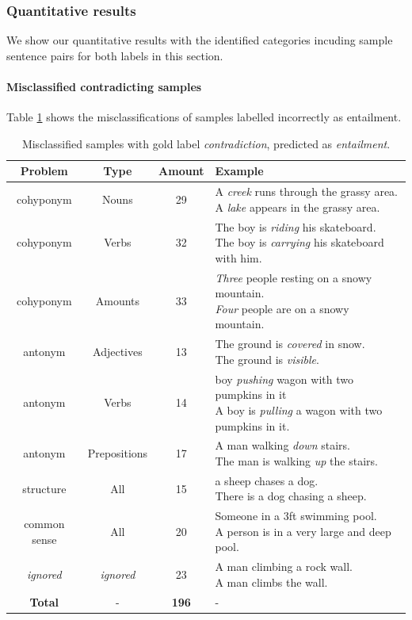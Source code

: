 \subsubsection{Quantitative results}
We show our quantitative results with the identified categories incuding sample sentence pairs for both labels in this section.

\paragraph*{Misclassified contradicting samples}
Table \ref{tab:misclassified_orig_contr} shows the misclassifications of samples labelled incorrectly as entailment.
\begin{table}[tph!]\label{tab:misclassified_orig_contr}
\centering
\begin{tabular}{cccl}
\textbf{Problem} & \textbf{Type} & \textbf{Amount} & \textbf{Example} \\
\toprule
cohyponym & Nouns & 29 & \specialcell{A \textit{creek} runs through the grassy area.\\A \textit{lake} appears in the grassy area.}\\
cohyponym & Verbs & 32 & \specialcell{The boy is \textit{riding} his skateboard.\\The boy is \textit{carrying} his skateboard with him.}\\
cohyponym & Amounts & 33 & \specialcell{\textit{Three} people resting on a snowy mountain.\\\textit{Four} people are on a snowy mountain.}\\
antonym & Adjectives & 13 & \specialcell{The ground is \textit{covered} in snow.\\The ground is \textit{visible}.}\\
antonym & Verbs & 14 & \specialcell{boy \textit{pushing} wagon with two pumpkins in it\\A boy is \textit{pulling} a wagon with two pumpkins in it.}\\
antonym & Prepositions & 17 & \specialcell{A man walking \textit{down} stairs.\\The man is walking \textit{up} the stairs.}\\
\midrule
structure & All & 15 & \specialcell{a sheep chases a dog.\\There is a dog chasing a sheep.}\\
common sense & All & 20 & \specialcell{Someone in a 3ft swimming pool.\\A person is in a very large and deep pool.}\\
\midrule
\textit{ignored} & \textit{ignored} & 23 & \specialcell{A man climbing a rock wall.\\A man climbs the wall.}\\
\midrule
\textbf{Total} & - & \textbf{196} & - \\
\bottomrule      
\end{tabular}
\caption{Misclassified samples with gold label \textit{contradiction}, predicted as \textit{entailment}.}
\end{table}
